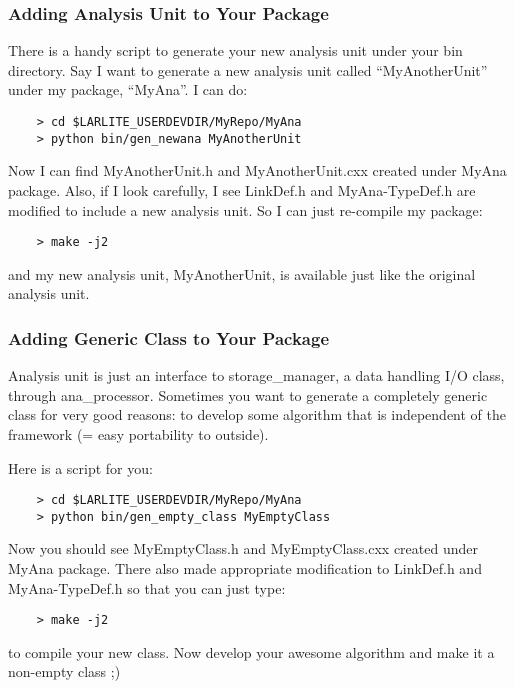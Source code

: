 \subsubsection{Adding Analysis Unit to Your Package}
There is a handy script to generate your new analysis unit under your {\ttfamily bin} directory. 
Say I want to generate a new analysis unit called ``MyAnotherUnit'' under my package, ``MyAna''. 
I can do:
\begin{lstlisting}
    > cd $LARLITE_USERDEVDIR/MyRepo/MyAna
    > python bin/gen_newana MyAnotherUnit
\end{lstlisting}
Now I can find {\ttfamily MyAnotherUnit.h} and {\ttfamily MyAnotherUnit.cxx} created under {\ttfamily MyAna}
package. Also, if I look carefully, I see {\ttfamily LinkDef.h} and {\ttfamily MyAna-TypeDef.h} are modified
to include a new analysis unit. So I can just re-compile my package:
\begin{lstlisting}
    > make -j2
\end{lstlisting}
and my new analysis unit, {\ttfamily MyAnotherUnit}, is available just like the original analysis unit.

\subsubsection{Adding Generic \CPP Class to Your Package}
Analysis unit is just an interface to {\ttfamily storage\_manager}, a data handling I/O class, through
{\ttfamily ana\_processor}. Sometimes you want to generate a completely generic \CPP class for very good
reasons: to develop some algorithm that is independent of the framework (= easy portability to outside).

Here is a script for you:
\begin{lstlisting}
    > cd $LARLITE_USERDEVDIR/MyRepo/MyAna
    > python bin/gen_empty_class MyEmptyClass
\end{lstlisting}
Now you should see {\ttfamily MyEmptyClass.h} and {\ttfamily MyEmptyClass.cxx} created under {\ttfamily MyAna}
package. There also made appropriate modification to {\ttfamily LinkDef.h} and {\ttfamily MyAna-TypeDef.h}
so that you can just type:
\begin{lstlisting}
    > make -j2
\end{lstlisting}
to compile your new class. Now develop your awesome algorithm and make it a non-empty class ;)
